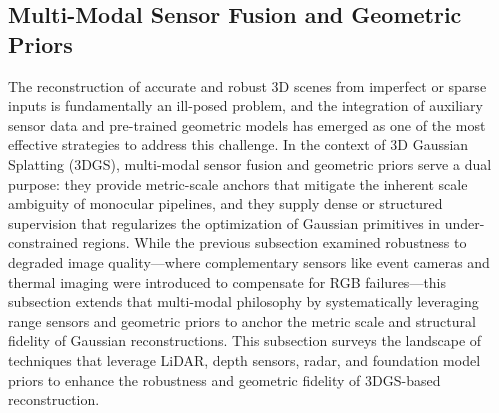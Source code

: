 \documentclass[11pt]{article}
\begin{document}
\subsection{Multi-Modal Sensor Fusion and Geometric Priors}

The reconstruction of accurate and robust 3D scenes from imperfect or sparse inputs is fundamentally an ill-posed problem, and the integration of auxiliary sensor data and pre-trained geometric models has emerged as one of the most effective strategies to address this challenge. In the context of 3D Gaussian Splatting (3DGS), multi-modal sensor fusion and geometric priors serve a dual purpose: they provide metric-scale anchors that mitigate the inherent scale ambiguity of monocular pipelines, and they supply dense or structured supervision that regularizes the optimization of Gaussian primitives in under-constrained regions. While the previous subsection examined robustness to degraded image quality---where complementary sensors like event cameras and thermal imaging were introduced to compensate for RGB failures---this subsection extends that multi-modal philosophy by systematically leveraging range sensors and geometric priors to anchor the metric scale and structural fidelity of Gaussian reconstructions. This subsection surveys the landscape of techniques that leverage LiDAR, depth sensors, radar, and foundation model priors to enhance the robustness and geometric fidelity of 3DGS-based reconstruction.
\end{document}
